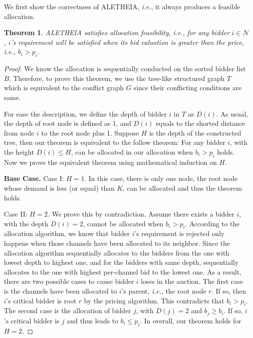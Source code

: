 \documentclass{sig-alternate}
\newtheorem{theorem}{Theorem}
\begin{document}
We first show the correctness of ALETHEIA, \textit{i.e.}, it always produces a feasible allocation.
\begin{theorem}
\label{th_fea}
   ALETHEIA satisfies allocation feasibility, \textit{i.e.}, for any bidder $i\in \mathcal{N}$, $i$'s requirement will be satisfied when its bid valuation is greater than the price, \textit{i.e.}, $b_i > p_i$.
\end{theorem}
\begin{proof}

We know the allocation is sequentially conducted on the sorted bidder list $B$. Therefore, to prove this theorem, we use the tree-like structured graph $T$ which is equivalent to the conflict graph $G$ since their conflicting conditions are same.

For ease the description, we define the depth of bidder $i$ in $T$ as $D(i)$. As usual, the depth of root node is defined as 1, and $D(i)$ equals to the shorted distance from node $i$ to the root node plus 1. Suppose $H$ is the depth of the constructed tree, then our theorem is equivalent to the follow theorem: For any bidder $i$, with the height $D(i) \le H$, can be allocated in our allocation when $b_i > p_i$ holds. Now we prove the equivalent theorem using mathematical induction on $H$.

\textbf{Base Case.}
Case I: $H=1$. In this case, there is only one node, the root node whose demand is less (or equal) than $K$, can be allocated and thus the theorem holds.

Case II: $H=2$. We prove this by contradiction. Assume there exists a bidder $i$, with the depth $D(i)=2$, cannot be allocated when $b_i > p_i$. According to the allocation algorithm, we know that bidder $i$'s requirement is rejected only happens when those channels have been allocated to its neighbor. Since the allocation algorithm sequentially allocates to the bidders from the one with lowest depth to highest one, and for the bidders with same depth, sequentially allocates to the one with highest per-channel bid to the lowest one. As a result, there are two possible cases to cause bidder $i$ loses in the auction. The first case is the channels have been allocated to $i$'s parent, \emph{i.e.,} the root node $r$. If so, then $i$'s critical bidder is root $r$ by the pricing algorithm. This contradicts that $b_i > p_i$. The second case is the allocation of bidder $j$, with $D(j)=2$ and $b_j \ge b_i$. If so, $i$'s critical bidder is $j$ and thus leads to $b_i \le p_i$. In overall, our theorem holds for $H=2$.


\end{proof}
\end{document}
